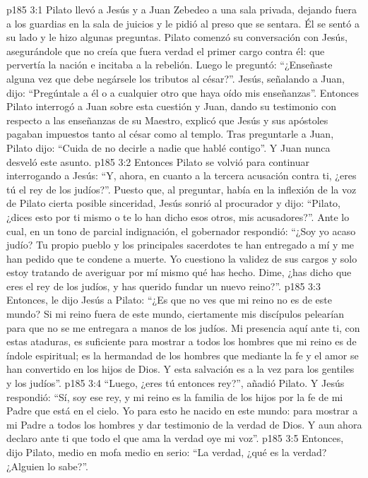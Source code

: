 \vs p185 3:1 Pilato llevó a Jesús y a Juan Zebedeo a una sala privada, dejando fuera a los guardias en la sala de juicios y le pidió al preso que se sentara. Él se sentó a su lado y le hizo algunas preguntas. Pilato comenzó su conversación con Jesús, asegurándole que no creía que fuera verdad el primer cargo contra él: que pervertía la nación e incitaba a la rebelión. Luego le preguntó: “¿Enseñaste alguna vez que debe negársele los tributos al césar?”. Jesús, señalando a Juan, dijo: “Pregúntale a él o a cualquier otro que haya oído mis enseñanzas”. Entonces Pilato interrogó a Juan sobre esta cuestión y Juan, dando su testimonio con respecto a las enseñanzas de su Maestro, explicó que Jesús y sus apóstoles pagaban impuestos tanto al césar como al templo. Tras preguntarle a Juan, Pilato dijo: “Cuida de no decirle a nadie que hablé contigo”. Y Juan nunca desveló este asunto.
\vs p185 3:2 Entonces Pilato se volvió para continuar interrogando a Jesús: “Y, ahora, en cuanto a la tercera acusación contra ti, ¿eres tú el rey de los judíos?”. Puesto que, al preguntar, había en la inflexión de la voz de Pilato cierta posible sinceridad, Jesús sonrió al procurador y dijo: “Pilato, ¿dices esto por ti mismo o te lo han dicho esos otros, mis acusadores?”. Ante lo cual, en un tono de parcial indignación, el gobernador respondió: “¿Soy yo acaso judío? Tu propio pueblo y los principales sacerdotes te han entregado a mí y me han pedido que te condene a muerte. Yo cuestiono la validez de sus cargos y solo estoy tratando de averiguar por mí mismo qué has hecho. Dime, ¿has dicho que eres el rey de los judíos, y has querido fundar un nuevo reino?”.
\vs p185 3:3 Entonces, le dijo Jesús a Pilato: “¿Es que no ves que mi reino no es de este mundo? Si mi reino fuera de este mundo, ciertamente mis discípulos pelearían para que no se me entregara a manos de los judíos. Mi presencia aquí ante ti, con estas ataduras, es suficiente para mostrar a todos los hombres que mi reino es de índole espiritual; es la hermandad de los hombres que mediante la fe y el amor se han convertido en los hijos de Dios. Y esta salvación es a la vez para los gentiles y los judíos”.
\vs p185 3:4 “Luego, ¿eres tú entonces rey?”, añadió Pilato. Y Jesús respondió: “Sí, soy ese rey, y mi reino es la familia de los hijos por la fe de mi Padre que está en el cielo. Yo para esto he nacido en este mundo: para mostrar a mi Padre a todos los hombres y dar testimonio de la verdad de Dios. Y aun ahora declaro ante ti que todo el que ama la verdad oye mi voz”.
\vs p185 3:5 Entonces, dijo Pilato, medio en mofa medio en serio: “La verdad, ¿qué es la verdad? ¿Alguien lo sabe?”.
